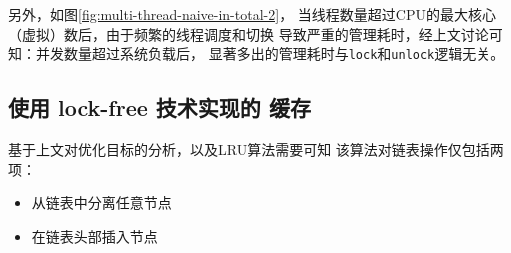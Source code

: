 另外，如图\ref{fig:multi-thread-naive-in-total-2}，
当线程数量超过CPU的最大核心（虚拟）数后，由于频繁的线程调度和切换
导致严重的管理耗时，经上文讨论可知：并发数量超过系统负载后，
显著多出的管理耗时与\verb|lock|和\verb|unlock|逻辑无关。

\subsection{使用 lock-free 技术实现的 缓存}

基于上文对优化目标的分析，以及LRU算法需要可知
该算法对链表操作仅包括两项：
\begin{itemize}
    \item 从链表中分离任意节点
    \item 在链表头部插入节点
\end{itemize}

